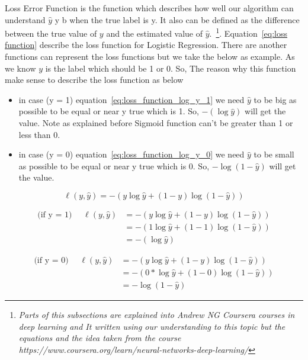 Loss Error Function is the function which describes how well our algorithm can understand  $\widehat{y}$ y b when the true label is y. It also can be defined as the difference between the true value of $y$ and the estimated value of  $\widehat{y}$.~\footnote{\textit{Parts of this subsections are explained into Andrew NG Coursera courses in deep learning and It written using our understanding to this topic but the equations and the idea taken from the course  https://www.coursera.org/learn/neural-networks-deep-learning/}}. Equation~\eqref{eq:loss function} describe the loss function for Logistic Regression. There are another functions can represent the loss functions but we take the below as example. As we know $y$ is the label which should be 1 or 0. So, The reason why this function make sense to describe the loss function as below
\begin{itemize}
\item in case (y = 1) equation~\eqref{eq:loss_function_log_y_1} we need $\widehat{y}$ to be big as possible to be equal or near y true which is 1. So, $ - (\log \widehat{y} )$ will get the value. Note as explained before Sigmoid function can't be greater than 1 or less than 0. %
\item in case (y = 0) equation~\eqref{eq:loss_function_log_y_0} we need $\widehat{y}$ to be small as possible to be equal or near y true which is 0. So, $- \log (1-\widehat{y})$  will get the value.  %
  \end{itemize}
  
\begin{equation}
  \label{eq:loss function}
    \ell(y,\widehat{y}) = - (y \log \widehat{y} + (1-y) \log (1-\widehat{y}))
  \end{equation}

\begin{equation} \label{eq:loss_function_log_y_1}
\begin{split}
  \text{(if y = 1) } \quad  \ell(y,\widehat{y}) & = - (y \log \widehat{y} + (1-y) \log (1-\widehat{y})) \\
  & = - (1 \log \widehat{y} + (1-1) \log (1-\widehat{y}))\\
  & = - (\log \widehat{y} )
\end{split}
\end{equation}


\begin{equation} \label{eq:loss_function_log_y_0}
\begin{split}
  \text{(if y = 0) } \quad  \ell(y,\widehat{y}) & = - (y \log \widehat{y} + (1-y) \log (1-\widehat{y})) \\
  & = - (0 * \log \widehat{y} + (1-0) \log (1-\widehat{y}))\\
  & = - \log (1-\widehat{y})
\end{split}
\end{equation}




